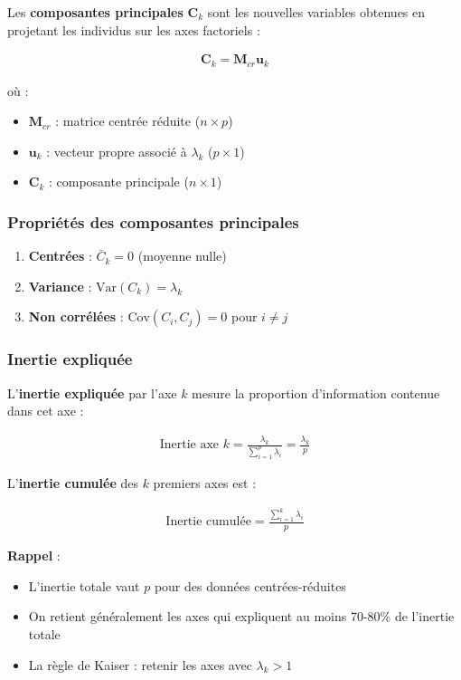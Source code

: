\documentclass[11pt,a4paper]{article}
\newcommand{\Var}{\text{Var}}
\newcommand{\Cov}{\text{Cov}}
\begin{document}
Les \textbf{composantes principales} $\mathbf{C}_k$ sont les nouvelles variables obtenues en projetant les individus sur les axes factoriels :

\begin{align*}
\mathbf{C}_k = \mathbf{M}_{cr} \mathbf{u}_k
\end{align*}

où :
\begin{itemize}
    \item $\mathbf{M}_{cr}$ : matrice centrée réduite ($n \times p$)
    \item $\mathbf{u}_k$ : vecteur propre associé à $\lambda_k$ ($p \times 1$)
    \item $\mathbf{C}_k$ : composante principale ($n \times 1$)
\end{itemize}

\subsubsection{Propriétés des composantes principales}

\begin{enumerate}
    \item \textbf{Centrées} : $\bar{C}_k = 0$ (moyenne nulle)
    \item \textbf{Variance} : $\Var(C_k) = \lambda_k$
    \item \textbf{Non corrélées} : $\Cov(C_i, C_j) = 0$ pour $i \neq j$
\end{enumerate}

\subsubsection{Inertie expliquée}

L'\textbf{inertie expliquée} par l'axe $k$ mesure la proportion d'information contenue dans cet axe :

\begin{align*}
\text{Inertie axe } k = \frac{\lambda_k}{\sum_{i=1}^{p} \lambda_i} = \frac{\lambda_k}{p}
\end{align*}

L'\textbf{inertie cumulée} des $k$ premiers axes est :

\begin{align*}
\text{Inertie cumulée} = \frac{\sum_{i=1}^{k} \lambda_i}{p}
\end{align*}

\begin{rappelbox}
\textbf{Rappel} : 
\begin{itemize}
    \item L'inertie totale vaut $p$ pour des données centrées-réduites
    \item On retient généralement les axes qui expliquent au moins 70-80\% de l'inertie totale
    \item La règle de Kaiser : retenir les axes avec $\lambda_k > 1$
\end{itemize}
\end{rappelbox}
\end{document}
